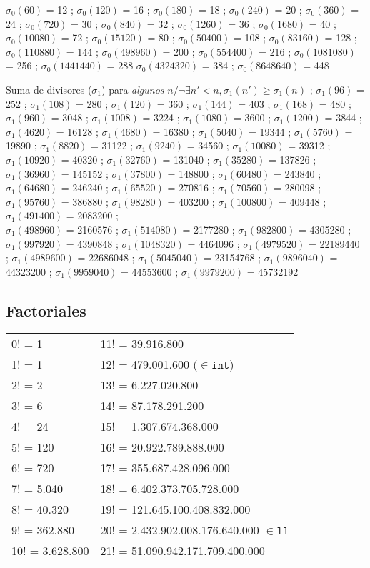 \documentclass{article}
\begin{document}
\begin{multicols*}{2}
$\sigma_0(60)$ = 12 ; $\sigma_0(120)$ = 16 ; $\sigma_0(180)$ = 18 ; $\sigma_0(240)$ = 20 ; $\sigma_0(360)$ = 24 ;
$\sigma_0(720)$ = 30 ; $\sigma_0(840)$ = 32 ; $\sigma_0(1260)$ = 36 ; $\sigma_0(1680)$ = 40 ; $\sigma_0(10080)$ = 72 ; $\sigma_0(15120)$ = 80 ; $\sigma_0(50400)$ = 108 ; $\sigma_0(83160)$ = 128 ; $\sigma_0(110880)$ = 144 ;
$\sigma_0(498960)$ = 200 ; $\sigma_0(554400)$ = 216 ; $\sigma_0(1081080)$ = 256 ; $\sigma_0(1441440)$ = 288  $\sigma_0(4324320)$ = 384 ; $\sigma_0(8648640)$ = 448

%
Suma de divisores ($\sigma_1$) para \emph{algunos} $n / \neg\exists n'<n, \sigma_1(n') \geqslant \sigma_1(n)$ ;
$\sigma_1(96)$ = 252 ; $\sigma_1(108)$ = 280 ; $\sigma_1(120)$ = 360 ; $\sigma_1(144)$ = 403 ; $\sigma_1(168)$ = 480 ;
$\sigma_1(960)$ = 3048 ; $\sigma_1(1008)$ = 3224 ; $\sigma_1(1080)$ = 3600 ; $\sigma_1(1200)$ = 3844 ;
$\sigma_1(4620)$ = 16128 ; $\sigma_1(4680)$ = 16380 ; $\sigma_1(5040)$ = 19344 ; $\sigma_1(5760)$ = 19890 ;
$\sigma_1(8820)$ = 31122 ; $\sigma_1(9240)$ = 34560 ; $\sigma_1(10080)$ = 39312 ; $\sigma_1(10920)$ = 40320 ;
$\sigma_1(32760)$ = 131040 ; $\sigma_1(35280)$ = 137826 ; $\sigma_1(36960)$ = 145152 ; $\sigma_1(37800)$ = 148800 ;
$\sigma_1(60480)$ = 243840 ; $\sigma_1(64680)$ = 246240 ; $\sigma_1(65520)$ = 270816 ; $\sigma_1(70560)$ = 280098 ;
$\sigma_1(95760)$ = 386880 ; $\sigma_1(98280)$ = 403200 ; $\sigma_1(100800)$ = 409448  ;
$\sigma_1(491400)$ = 2083200 ; \\$\sigma_1(498960)$ = 2160576 ; $\sigma_1(514080)$ = 2177280 ;
$\sigma_1(982800)$ = 4305280 ; $\sigma_1(997920)$ = 4390848 ; $\sigma_1(1048320)$ = 4464096 ;
$\sigma_1(4979520)$ = 22189440 ; $\sigma_1(4989600)$ = 22686048 ; $\sigma_1(5045040)$ = 23154768 ;
$\sigma_1(9896040)$ = 44323200 ; $\sigma_1(9959040)$ = 44553600 ; $\sigma_1(9979200)$ = 45732192
%
%
\subsection{Factoriales}
\begin{tabular}{l|l}
0! =	1             & 11! = 39.916.800  \\
1! =	1             & 12! =	479.001.600	($\in \mathtt{int}$)\\
2! =	2             & 13! =	6.227.020.800	\\
3! =	6             & 14! =	87.178.291.200	\\
4! =	24            & 15! =	1.307.674.368.000	\\
5! =	120   			  & 16! =	20.922.789.888.000	\\
6! =	720           & 17! =	355.687.428.096.000	\\
7! =	5.040	        & 18! =	6.402.373.705.728.000	\\
8! =	40.320	      & 19! =	121.645.100.408.832.000	\\
9! =	362.880       & 20! =	2.432.902.008.176.640.000 $\in \mathtt{ll}$ \\
10! =	3.628.800     & 21! =	51.090.942.171.709.400.000
\end{tabular}


\end{multicols*}
\end{document}
